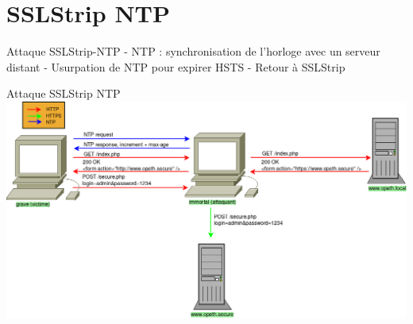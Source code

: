 \section{SSLStrip NTP}

\begin{frame}{Attaque SSLStrip-NTP}
  - NTP : synchronisation de l'horloge avec un serveur distant
  - Usurpation de NTP pour expirer HSTS
  - Retour à SSLStrip
\end{frame}

\begin{frame}{Attaque SSLStrip NTP}
    \includegraphics[width=\linewidth]{../medias/sslstrip-ntp/attack.png}
\end{frame}
